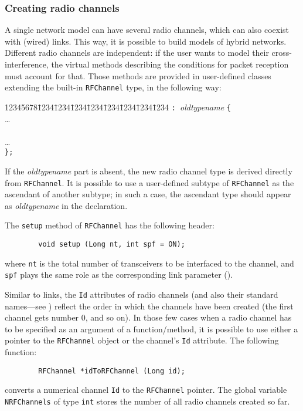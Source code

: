 \subsubsection{Creating radio channels}
\label{rm_to_rf_cr}

A single network model can have several radio channels,
which can also coexist with (wired) links.
This way, it is possible to build models of hybrid networks.
Different radio channels are independent: if the user wants to model their
cross-interference, the virtual methods describing the conditions for packet
reception must account for that.
Those methods are provided in user-defined classes extending the built-in
{\tt RFChannel} type, in the following way:

{\tt\begin{tabbing}
12345678\=1234\=1234\=1234\=1234\=1234\=1234\=1234\=1234\kill
{} {\tt : }{\em oldtypename\/} {\tt \{} \\
\> \>\ldots \\
\> \\
\> \>\ldots \\
\> {\tt \};}
\end{tabbing}}
\noindent
If the {\em oldtypename\/} part is absent,
the new radio channel type is derived directly from {\tt RFChannel}.
It is possible to use a user-defined subtype of {\tt RFChannel} as the
ascendant of
another subtype; in such a case, the ascendant type should appear as
{\em oldtypename\/} in the declaration.

The {\tt setup} method of {\tt RFChannel} has the following header:
\begin{verbatim}
        void setup (Long nt, int spf = ON);
\end{verbatim}
\noindent
where {\tt nt} is the total number of transceivers to be interfaced to the
channel, and {\tt spf} plays the same role as the
corresponding link parameter ().

Similar to links,
the {\tt Id} attributes of radio channels (and also their standard names---see
) reflect the order in which the channels have been created
(the first channel gets number 0, and so on).
In those few cases when a radio channel has to be specified as an argument of
a function/method, it is possible to use either
a pointer to the {\tt RFChannel} object or the channel's {\tt Id} attribute.
The following function:
\begin{verbatim}
        RFChannel *idToRFChannel (Long id);
\end{verbatim}
converts a numerical channel {\tt Id} to the {\tt RFChannel} pointer.
The global variable {\tt NRFChannels} of type {\tt int} stores the number of
all radio channels created so far.

